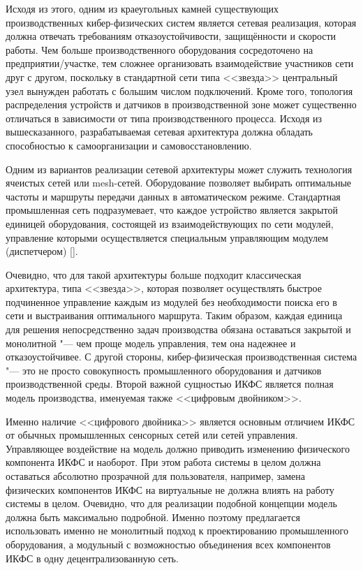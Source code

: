 Исходя из этого, одним из краеугольных камней существующих производственных кибер-физических систем является сетевая реализация, которая должна отвечать требованиям отказоустойчивости, защищённости и скорости работы. Чем больше производственного оборудования сосредоточено на предприятии/участке, тем сложнее организовать взаимодействие участников сети друг с другом, поскольку в стандартной сети типа <<звезда>> центральный узел вынужден работать с большим числом подключений. Кроме того, топология распределения устройств и датчиков в производственной зоне может существенно отличаться в зависимости от типа производственного процесса. Исходя из вышесказанного, разрабатываемая сетевая архитектура должна обладать способностью к самоорганизации и самовосстановлению.

Одним из вариантов реализации сетевой архитектуры может служить технология ячеистых сетей или mesh-сетей. Оборудование позволяет выбирать оптимальные частоты и маршруты передачи данных в автоматическом режиме. Стандартная промышленная сеть подразумевает, что каждое устройство является закрытой единицей оборудования, состоящей из взаимодействующих по сети модулей, управление которыми осуществляется специальным управляющим модулем (диспетчером) []. 

Очевидно, что для такой архитектуры больше подходит классическая архитектура, типа <<звезда>>, которая позволяет осуществлять быстрое подчиненное управление каждым из модулей без необходимости поиска его в сети и выстраивания оптимального маршрута. Таким образом, каждая единица для решения непосредственно задач производства обязана оставаться закрытой и монолитной "--- чем проще модель управления, тем она надежнее и отказоустойчивее. С другой стороны, кибер-физическая производственная система "--- это не просто совокупность промышленного оборудования и датчиков производственной среды. Второй важной сущностью ИКФС является полная модель производства, именуемая также <<цифровым двойником>>.

Именно наличие <<цифрового двойника>> является основным отличием ИКФС от обычных промышленных сенсорных сетей или сетей управления. Управляющее воздействие на модель должно приводить изменению физического компонента ИКФС и наоборот. При этом работа системы в целом должна оставаться абсолютно прозрачной для пользователя, например, замена физических компонентов ИКФС на виртуальные не должна влиять на работу системы в целом. Очевидно, что для реализации подобной концепции модель должна быть максимально подробной. Именно поэтому предлагается использовать именно не монолитный подход к проектированию промышленного оборудования, а модульный с возможностью объединения всех компонентов ИКФС в одну децентрализованную сеть. 

